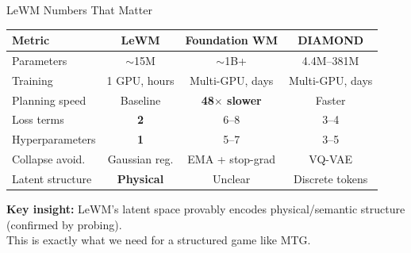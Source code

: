 \documentclass[aspectratio=169, 11pt]{beamer}
\begin{document}
\begin{frame}{LeWM Numbers That Matter}
  \begin{center}
  \begin{tabular}{@{}lccc@{}}
    \toprule
    \textbf{Metric} & \textbf{LeWM} & \textbf{Foundation WM} & \textbf{DIAMOND} \\
    \midrule
    Parameters       & $\sim$15M     & $\sim$1B+              & 4.4M--381M \\
    Training         & 1 GPU, hours  & Multi-GPU, days        & Multi-GPU, days \\
    Planning speed   & Baseline      & \textbf{48$\times$ slower}  & Faster \\
    Loss terms       & \textbf{2}    & 6--8                   & 3--4 \\
    Hyperparameters  & \textbf{1}    & 5--7                   & 3--5 \\
    Collapse avoid.  & Gaussian reg. & EMA + stop-grad        & VQ-VAE \\
    Latent structure & \textbf{Physical} & Unclear             & Discrete tokens \\
    \bottomrule
  \end{tabular}
  \end{center}
  \vspace{0.4cm}
  \begin{center}
    \textbf{Key insight:} LeWM's latent space provably encodes
    physical/semantic structure (confirmed by probing).\\
    This is exactly what we need for a structured game like MTG.
  \end{center}
\end{frame}
\end{document}
